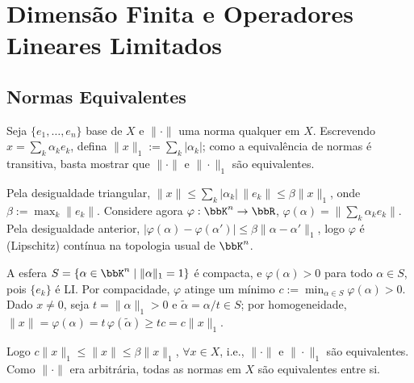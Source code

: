 \chapter{Dimensão Finita e Operadores Lineares Limitados}

\section{Normas Equivalentes}



\begin{myproof}
	Seja $\{e_1,\dots,e_n\}$ base de $X$ e $\|\cdot\|$ uma norma qualquer em $X$. Escrevendo
	$x=\sum_k\alpha_ke_k$, defina $\|x\|_1:=\sum_k|\alpha_k|$; como a equivalência de normas é
	transitiva, basta mostrar que $\|\cdot\|$ e $\|\cdot\|_1$ são equivalentes.

	Pela desigualdade triangular, $\|x\|\leq\sum_k|\alpha_k|\,\|e_k\|\leq\beta\|x\|_1$, onde
	$\beta:=\max_k\|e_k\|$. Considere agora $\varphi:\bbK^n\to\bbR$, $\varphi(\alpha)=\|\sum_k\alpha_ke_k\|$.
	Pela desigualdade anterior, $|\varphi(\alpha)-\varphi(\alpha')|\leq\beta\|\alpha-\alpha'\|_1$, logo
	$\varphi$ é (Lipschitz) contínua na topologia usual de $\bbK^n$.

	A esfera $S=\{\alpha\in\bbK^n \mid \|\alpha\|_1=1\}$ é compacta, e $\varphi(\alpha)>0$ para todo
	$\alpha\in S$, pois $\{e_k\}$ é LI. Por compacidade, $\varphi$ atinge um mínimo
	$c:=\min_{\alpha\in S}\varphi(\alpha)>0$. Dado $x\neq 0$, seja $t=\|\alpha\|_1>0$ e
	$\tilde\alpha=\alpha/t\in S$; por homogeneidade, $\|x\|=\varphi(\alpha)=t\,\varphi(\tilde\alpha)\geq
	tc=c\|x\|_1$.

	Logo $c\|x\|_1\leq\|x\|\leq\beta\|x\|_1$, $\forall x\in X$, i.e., $\|\cdot\|$ e $\|\cdot\|_1$ são
	equivalentes. Como $\|\cdot\|$ era arbitrária, todas as normas em $X$ são equivalentes entre si.
\end{myproof}


